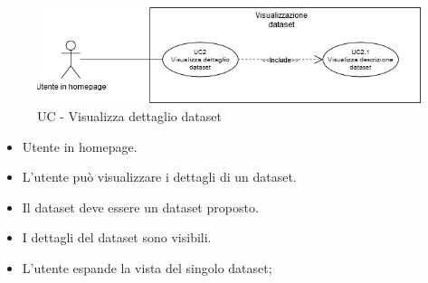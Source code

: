     \begin{figure}[h!]
        \centering
        \includegraphics[scale=0.55]{template/images/UC2.png}
        \caption{UC - Visualizza dettaglio dataset}
    \end{figure}
    \UCdsc
    { %
        \begin{itemize}
            \item Utente in homepage.
        \end{itemize}
    }
    { %
        \begin{itemize}
            \item  L'utente può visualizzare i dettagli di un dataset.
        \end{itemize}
    }
    { %
        \begin{itemize}
            \item Il dataset deve essere un dataset proposto.
        \end{itemize}
    }
    { %
        \begin{itemize}
            \item I dettagli del dataset sono visibili.
        \end{itemize}
    }
    { %
        \begin{itemize}
            \item L'utente espande la vista del singolo dataset;
        \end{itemize}
    }
    

